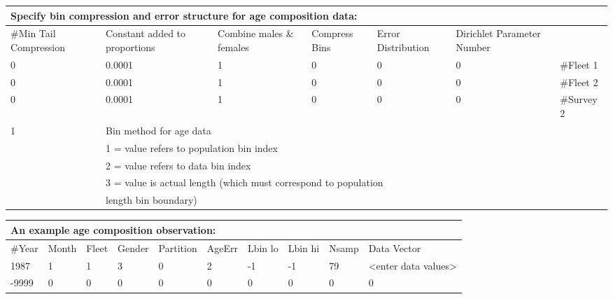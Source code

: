 \begin{center}
	\begin{tabular}{p{2cm} p{2cm} p{2cm} p{2cm} p{2cm} p{2cm} p{2cm}}
		\multicolumn{6}{l}{Specify bin compression and error structure for age composition data:}\\
		\hline
		\#Min Tail Compression & Constant added to proportions & Combine males \& females & Compress Bins & Error Distribution & Dirichlet Parameter Number & \\
		\hline
		0 & 0.0001 & 1 & 0 & 0 & 0 & \#Fleet 1\\
		0 & 0.0001 & 1 & 0 & 0 & 0 & \#Fleet 2\\
		0 & 0.0001 & 1 & 0 & 0 & 0 & \#Survey 2\\
		\hline
		1 & \multicolumn{6}{l}{Bin method for age data}\\
		  & \multicolumn{6}{l}{1 = value refers to population bin index}\\
		  & \multicolumn{6}{l}{2 = value refers to data bin index}\\
		  & \multicolumn{6}{l}{3 = value is actual length (which must correspond to population }\\
		  & \multicolumn{6}{l}{length bin boundary)}\\
	    \hline
	\end{tabular}
\end{center}

\begin{center}
	\begin{tabular}{p{1cm} p{1cm} p{1cm} p{1cm} p{1.5cm} p{1cm} p{1.5cm} p{1.5cm} p{1cm} p{2.5cm}}
		\multicolumn{10}{l}{An example age composition observation:}\\
		\hline
		\#Year & Month & Fleet & Gender & Partition & AgeErr & Lbin lo & Lbin hi & Nsamp & Data Vector \\
		\hline
		1987 & 1 & 1 & 3 & 0 & 2 & -1 & -1 & 79 & <enter data values>\\
		-9999 & 0 & 0 & 0 & 0 & 0 & 0 & 0 & 0 & 0\\
		\hline
	\end{tabular}
\end{center}

